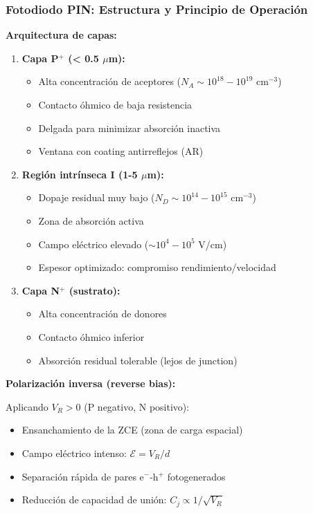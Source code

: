 \documentclass[11pt,a4paper]{article}
\begin{document}
\subsubsection{Fotodiodo PIN: Estructura y Principio de Operación}

\textbf{Arquitectura de capas:}

\begin{enumerate}
    \item \textbf{Capa P$^+$ (< 0.5 $\mu$m):} 
    \begin{itemize}
        \item Alta concentración de aceptores ($N_A \sim 10^{18}-10^{19}$ cm$^{-3}$)
        \item Contacto óhmico de baja resistencia
        \item Delgada para minimizar absorción inactiva
        \item Ventana con coating antirreflejos (AR)
    \end{itemize}
    
    \item \textbf{Región intrínseca I (1-5 $\mu$m):}
    \begin{itemize}
        \item Dopaje residual muy bajo ($N_D \sim 10^{14}-10^{15}$ cm$^{-3}$)
        \item Zona de absorción activa
        \item Campo eléctrico elevado ($\sim 10^4-10^5$ V/cm)
        \item Espesor optimizado: compromiso rendimiento/velocidad
    \end{itemize}
    
    \item \textbf{Capa N$^+$ (sustrato):}
    \begin{itemize}
        \item Alta concentración de donores
        \item Contacto óhmico inferior
        \item Absorción residual tolerable (lejos de junction)
    \end{itemize}
\end{enumerate}

\textbf{Polarización inversa (reverse bias):}

Aplicando $V_R > 0$ (P negativo, N positivo):
\begin{itemize}
    \item Ensanchamiento de la ZCE (zona de carga espacial)
    \item Campo eléctrico intenso: $\mathcal{E} = V_R/d$
    \item Separación rápida de pares e$^-$-h$^+$ fotogenerados
    \item Reducción de capacidad de unión: $C_j \propto 1/\sqrt{V_R}$
\end{itemize}
\end{document}
